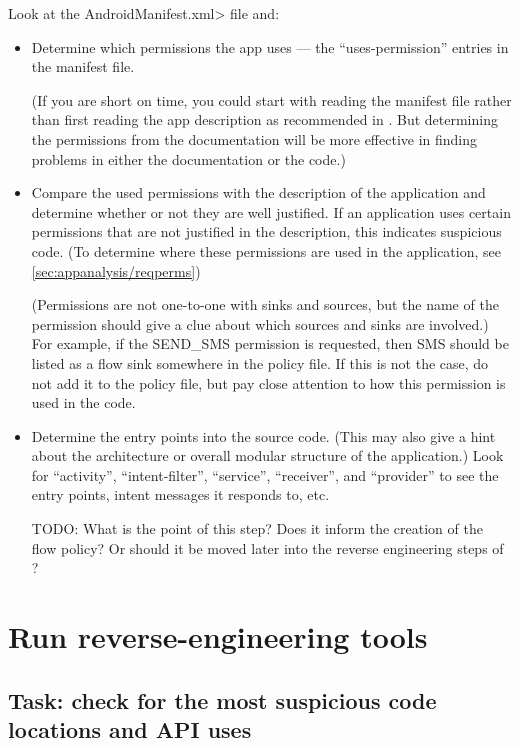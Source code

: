 Look at the \<AndroidManifest.xml> file and:
\begin{itemize}
\item Determine which permissions the app uses --- the ``uses-permission''
  entries in the manifest file.

  (If you are short on time, you could start with reading the manifest file
  rather than first reading the app description as recommended in
  .  But determining the permissions
  from the documentation will be more effective in finding problems in
  either the documentation or the code.)
\item Compare the used permissions with the description of the
  application and determine whether or not they are well justified.
  If an application uses certain permissions that are not justified
  in the description, this indicates suspicious code. 
  (To determine where these permissions are used in the application,
   see \ref{sec:appanalysis/reqperms})

  (Permissions are not one-to-one with sinks and sources, but the name of the permission should give 
  a clue about which sources and sinks are involved.)  For example, if the SEND\_SMS permission is 
  requested, then SMS should be listed as a flow sink somewhere in the policy file.  If this is not the 
  case, do not add it to the policy file, but pay close attention to how this permission is used in the 
  code.

\item Determine the entry points into the source code. (This may also give
  a hint about the architecture or overall modular structure of the
  application.)
  Look for ``activity'', ``intent-filter'', ``service'', ``receiver'', and
  ``provider'' to see the entry points, intent messages it responds to,
  etc.

  TODO:  What is the point of this step?  Does it inform the creation of
  the flow policy?  Or should it be moved later into the reverse
  engineering steps of ?
\end{itemize}



\section{Run reverse-engineering tools\label{sec:reverse-engineering}}



\subsection{Task: check for the most suspicious code locations and API uses}
\label{sec:appanalysis/suspicious}


